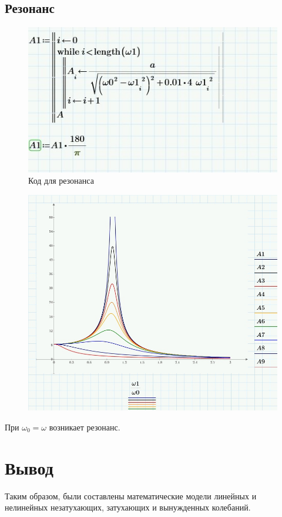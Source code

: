 \documentclass[a4paper, 14pt]{extarticle}
\begin{document}
		\subsection{Резонанс}
		\begin{figure}[H]
			\centering
			\includegraphics[width = .7\linewidth]{22.jpg}
			\caption[.] {Код для резонанса}
		\end{figure}	
		\begin{figure}[H]
			\centering
			\includegraphics[width = .65\linewidth]{18.jpg}
		\end{figure}
		При $\omega_0 = \omega$ возникает резонанс.
		
	\section{Вывод}
		Таким образом, были составлены математические модели линейных и нелинейных незатухающих, затухающих и вынужденных колебаний. 
		
\end{document}
